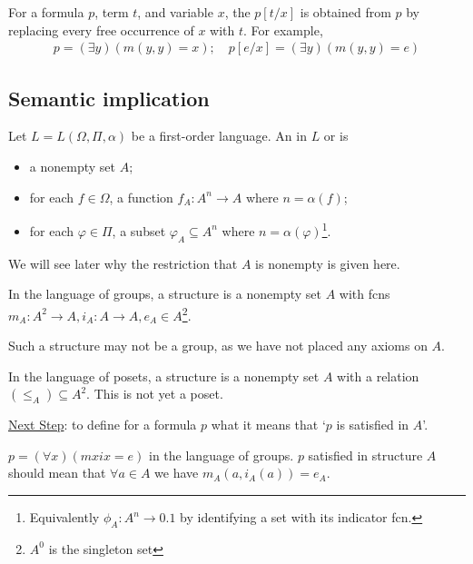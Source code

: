 For a formula $p$, term $t$, and variable $x$, the  $p[t/x]$ is obtained from $p$ by replacing every free occurrence of $x$ with $t$.
For example,
\begin{align*}
    p = (\exists y)(m(y,y) = x);\quad p[e/x] = (\exists y)(m(y,y) = e)
\end{align*}

\subsection{Semantic implication}
\begin{definition}[Structure]
    Let $L = L(\Omega, \Pi, \alpha)$ be a first-order language.
    An  in $L$ or  is
    \begin{itemize}
        \item a nonempty set $A$;
        \item for each $f \in \Omega$, a function $f_A \colon A^n \to A$ where $n = \alpha(f)$;
        \item for each $\varphi \in \Pi$, a subset $\varphi_A \subseteq A^n$ where $n = \alpha(\varphi)$\footnote{Equivalently $\phi_A : A^n \to \qty{0, 1}$ by identifying a set with its indicator fcn.}.
    \end{itemize}
\end{definition}

\begin{remark}
    We will see later why the restriction that $A$ is nonempty is given here.
\end{remark}

\begin{example}
    In the language of groups, a structure is a nonempty set $A$ with fcns $m_A \colon A^2 \to A, i_A \colon A \to A, e_A \in A$\footnote{$A^0$ is the singleton set}.

    Such a structure may not be a group, as we have not placed any axioms on $A$.
\end{example}

\begin{example}
    In the language of posets, a structure is a nonempty set $A$ with a relation $(\leq_A) \subseteq A^2$.
    This is not yet a poset.
\end{example}

\underline{Next Step}: to define for a formula $p$ what it means that `$p$ is satisfied in $A$'.

\begin{example}
    $p = (\forall x)(m x i x = e)$ in the language of groups.
    $p$ satisfied in structure $A$ should mean that $\forall a \in A$ we have $m_A(a, i_A(a)) = e_A$.
\end{example}

